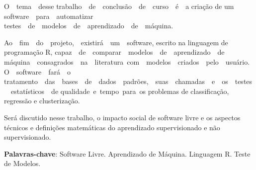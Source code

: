 


\begin{resumo}

O  tema  desse trabalho  de  conclusão  de  curso  é  a criação de um software  para  automatizar testes  de  modelos  de  aprendizado  de  máquina. 

Ao  fim  do  projeto,  existirá  um  software, escrito na linguagem de programação R, capaz  de  comparar  modelos  de  aprendizado  de máquina  consagrados  na  literatura com  modelos  criados  pelo  usuário.  O  software  fará  o tratamento  das  bases  de  dados  padrões,  suas  chamadas  e  os  testes  estatísticos  de qualidade e tempo para os problemas de classificação, regressão e clusterização.

Será discutido nesse trabalho, o impacto social de software livre e os aspectos técnicos e definições matemáticas do aprendizado supervisionado e não supervisionado.

\textbf{Palavras-chave}: Software Livre. Aprendizado de Máquina. Linguagem R. Teste de Modelos.

 

\end{resumo}



